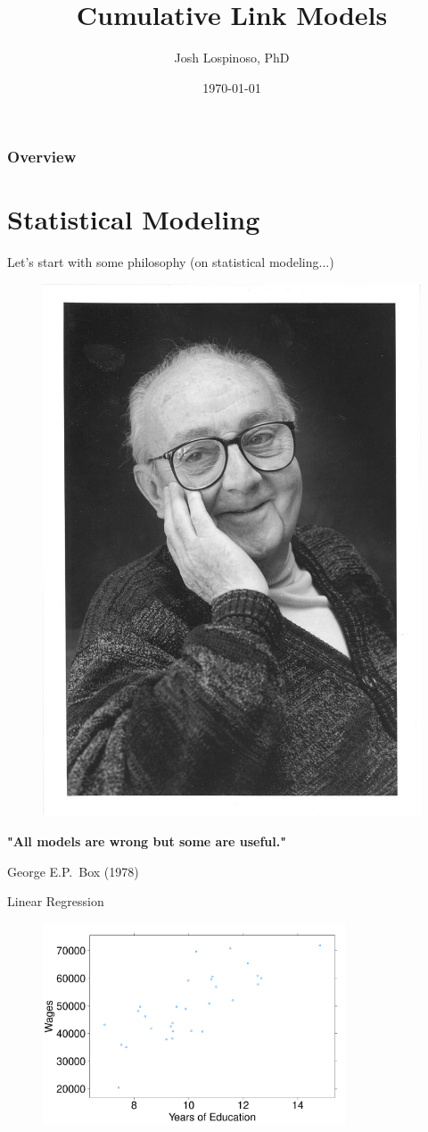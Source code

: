 \documentclass{beamer}
\title[CLM 2015]{Cumulative Link Models}
\author{Josh Lospinoso, PhD}
\institute{
\textit{josh@lospi.net}
}
\date{\today}
\begin{document}


\begin{frame}
\titlepage
\end{frame}

\begin{frame}
\frametitle{Overview}
\tableofcontents
\end{frame}


\section{Statistical Modeling}
\begin{frame}
Let's start with some philosophy (on statistical modeling...)
\end{frame}

\begin{frame}
\begin{figure}
\centering
\includegraphics[width=.3\textwidth]{800px-GeorgeEPBox}
\label{fig:george_box}
\end{figure}
\begin{center}
\textbf{"All models are wrong but some are useful."} 

\vspace{10px}

George E.P.\ Box (1978)
\end{center}
\end{frame}




\begin{frame}{Linear Regression}
\begin{figure}
\centering
\includegraphics[width=0.8\textwidth]{linreg_plot_1}
\label{fig:linreg_plot_1}
\end{figure}
\end{frame}
\end{document}
